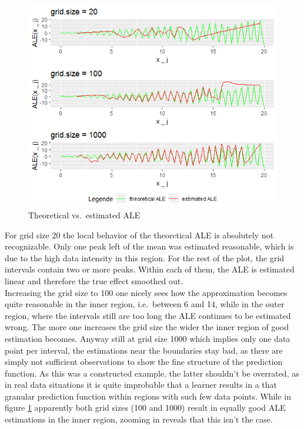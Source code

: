 \documentclass[]{krantz}
\begin{document}
\begin{figure}
\includegraphics[width=1\linewidth]{images/ALE_2_example3_3gs_} \caption{Theoretical vs.~estimated ALE}\label{fig:example33gs}
\end{figure}



For grid size 20 the local behavior of the theoretical ALE is absolutely
not recognizable. Only one peak left of the mean was estimated
reasonable, which is due to the high data intensity in this region. For
the rest of the plot, the grid intervals contain two or more peaks.
Within each of them, the ALE is estimated linear and therefore the true
effect smoothed out.\\
Increasing the grid size to 100 one nicely sees how the approximation
becomes quite reasonable in the inner region, i.e.~between 6 and 14,
while in the outer region, where the intervals still are too long the
ALE continues to be estimated wrong. The more one increases the grid
size the wider the inner region of good estimation becomes. Anyway still
at grid size 1000 which implies only one data point per interval, the
estimations near the boundaries stay bad, as there are simply not
sufficient observations to show the fine structure of the prediction
function. As this was a constructed example, the latter shouldn't be
overrated, as in real data situations it is quite improbable that a
learner results in a that granular prediction function within regions
with such few data points. While in figure \ref{fig:example33gs}
apparently both grid sizes (100 and 1000) result in equally good ALE
estimations in the inner region, zooming in reveals that this isn't the
case.
\end{document}
